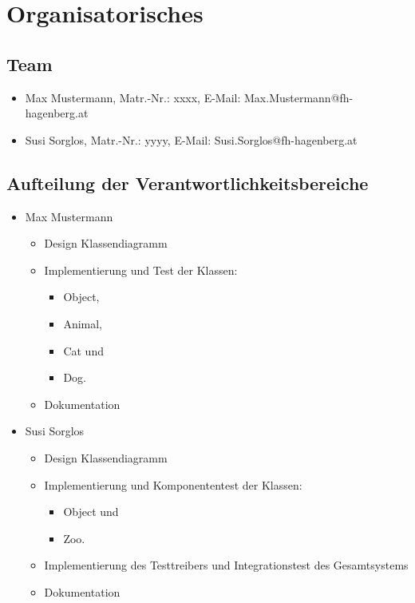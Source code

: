 \documentclass[12pt,naustrian,a4widepaper]{scrartcl}
\begin{document}
\section{Organisatorisches}

\subsection{Team}
\begin{itemize}
	\item Max Mustermann, Matr.-Nr.: xxxx, E-Mail: Max.Mustermann@fh-hagenberg.at	
	\item Susi Sorglos, Matr.-Nr.: yyyy, E-Mail: Susi.Sorglos@fh-hagenberg.at	
\end{itemize}

\subsection{Aufteilung der Verantwortlichkeitsbereiche}
\begin{itemize}
	\item Max Mustermann
		\begin{itemize}
			\item Design Klassendiagramm
			\item Implementierung und Test der Klassen: 
			\begin{itemize}
				\item Object,
				\item Animal, 
				\item Cat und
				\item Dog.
			\end{itemize}
			\item Dokumentation
		\end{itemize}
	\item Susi Sorglos
		\begin{itemize}
			\item Design Klassendiagramm
			\item Implementierung und Komponententest der Klassen: 
			\begin{itemize}
				\item Object und
				\item Zoo. 
			\end{itemize}
			\item Implementierung des Testtreibers und Integrationstest des Gesamtsystems
			\item Dokumentation
		\end{itemize}	
\end{itemize}
\end{document}
